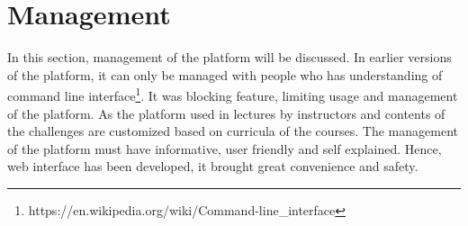 \chapter{Management}

In this section, management of the platform will be discussed. In earlier versions of the platform, it can only be managed with people who has understanding of command line interface\footnote{https://en.wikipedia.org/wiki/Command-line_interface}. It was blocking feature, limiting usage and management of the platform. As the platform used in lectures by instructors and contents of the challenges are customized based on curricula of the courses. The management of the platform must have informative, user friendly and self explained. Hence, web interface has been developed, it brought great convenience and safety. 
